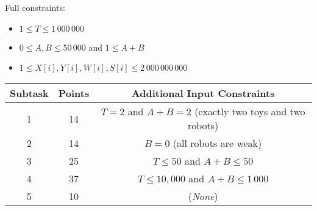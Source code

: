 Full constraints:
\begin{itemize}
\item $1 \leq T \leq 1\,000\,000$
\item $0\leq A,B\leq 50\,000$ and $1\leq A+B$
\item $1 \leq X[i], Y[i], W[i], S[i] \leq 2\,000\,000\,000$
\end{itemize}

\begin{center}
\begin{tabular}{ |c|c|c| }
\hline
Subtask & Points & Additional Input Constraints\\
\hline
1 & 14 & $T=2$ and $A+B=2$ (exactly two toys and two robots)\\
\hline
2 & 14 & $B = 0$ (all robots are weak)\\
\hline
3 & 25 & $T\leq 50$ and $A+B\leq 50$\\
\hline
4 & 37 & $T\leq 10,000$ and $A+B\leq 1\,000$\\
\hline
5 & 10 & (\textit{None})\\
\hline
\end{tabular}
\end{center}